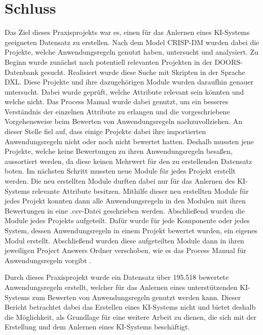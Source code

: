 \chapter{Schluss}
\label{chap:Schluss}
Das Ziel dieses Praxisprojekts war es, einen für das Anlernen eines KI-Systems geeigneten Datensatz zu erstellen. Nach dem Model \acs{CRISP-DM} wurden dabei die Projekte, welche
Anwendungsregeln genutzt haben, untersucht und analysiert. Zu Beginn wurde zunächst nach potentiell relevanten Projekten in der \acs{DOORS}-Datenbank gesucht. Realisiert wurde diese Suche mit Skripten
in der Sprache \acs{DXL}.
Diese Projekte und ihre dazugehörigen Module wurden daraufhin genauer untersucht. Dabei wurde geprüft, welche Attribute relevant sein könnten und welche nicht. Das Process Manual wurde dabei genutzt,
um ein besseres Verständnis der einzelnen Attribute zu erlangen und die vorgeschriebene Vorgehensweise beim Bewerten von Anwendungsregeln nachzuvollziehen. An dieser Stelle fiel auf, dass einige
Projekte dabei ihre importierten Anwendungsregeln nicht oder noch nicht bewertet hatten. Deshalb mussten jene Projekte, welche keine Bewertungen zu ihren Anwendungsregeln besaßen, aussortiert werden,
da diese keinen Mehrwert für den zu erstellenden Datensatz boten. Im nächsten Schritt mussten neue Module für jedes Projekt erstellt werden. Die neu erstellten Module durften dabei nur für das Anlernen
des KI-Systems relevante Attribute besitzen. Mithilfe dieser neu erstellten Module für jedes Projekt konnten dann alle Anwendungsregeln in den Modulen mit ihren Bewertungen in eine .csv-Datei geschrieben 
werden. Abschließend wurden die Module jedes Projekts aufgeteilt. Dafür wurde für jede Komponente oder jedes System, dessen Anwendungsregeln in einem Projekt bewertet wurden, ein eigenes Modul erstellt. 
Abschließend wurden diese aufgeteilten Module dann in ihren jeweiligen Project Answers Ordner verschoben, wie es das Process Manual für Anwendungsregeln vorgibt \cite[S.32]{q2}. 

Durch dieses Praxisprojekt wurde ein Datensatz über 195.518 bewertete Anwendungsregeln erstellt, welcher für das Anlernen eines unterstützenden KI-Systems zum Bewerten von Anwendungsregeln genutzt werden
kann. Dieser Bericht betrachtet dabei das Erstellen eines KI-Systems nicht und bietet deshalb die Möglichkeit, als Grundlage für eine weitere Arbeit zu dienen, die sich mit der Erstellung und dem Anlernen
eines KI-Systems beschäftigt.
